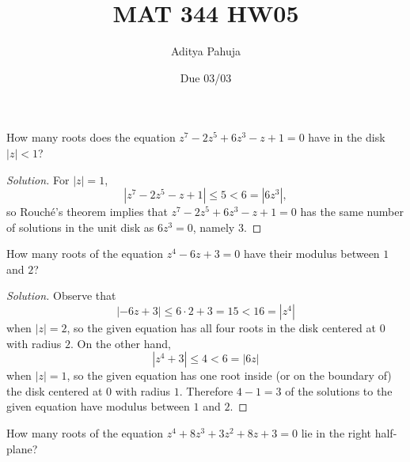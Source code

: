 \documentclass[10pt]{article}
\title{MAT 344 HW05}
\author{\large Aditya Pahuja}
\date{\large Due 03/03}
\newenvironment{soln}{\begin{proof}[Solution]}{\end{proof}}
\providecommand{\abs}[1]{\left\lvert #1\right\rvert}
\begin{document}
\maketitle

\begin{problem}
    How many roots does the equation
    $z^7 - 2z^5 + 6z^3 - z + 1 = 0$ have
    in the disk $|z| < 1$?
\end{problem}

\begin{soln}
    For $\abs z = 1$,
    \begin{equation*}
	\abs{z^7 - 2z^5 - z + 1} \le 5 < 6 = \abs{6z^3},
    \end{equation*}
    so Rouch\'e's theorem implies that
    $z^7 - 2z^5 + 6z^3 - z + 1 = 0$ has the same number of solutions
    in the unit disk as $6z^3 = 0$, namely $\boxed 3$.
\end{soln}

\begin{problem}
    How many roots of the equation $z^4 - 6z + 3 = 0$
    have their modulus between $1$ and $2$?
\end{problem}

\begin{soln}
    Observe that
    \begin{equation*}
	\abs{-6z + 3} \le 6\cdot 2 + 3 = 15 < 16 = \abs{z^4}
    \end{equation*}
    when $\abs z = 2$, so the given equation has all four roots
    in the disk centered at $0$ with radius $2$.
    On the other hand,
    \begin{equation*}
	\abs{z^4 + 3} \le 4 < 6 = \abs{6z}
    \end{equation*}
    when $\abs z = 1$, so the given equation has one root inside
    (or on the boundary of) the disk centered at $0$ with radius $1$.
    Therefore $4-1=\boxed{3}$ of the solutions to the given equation
    have modulus between $1$ and $2$.
\end{soln}

\begin{problem}
    How many roots of the equation
    $z^4 + 8z^3 + 3z^2 + 8z + 3 = 0$
    lie in the right half-plane?
\end{problem}
\end{document}

